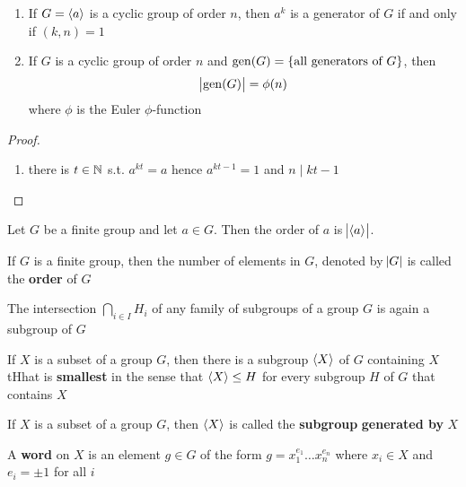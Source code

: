 \documentclass[11pt]{article}
\begin{document}
\begin{theorem}[]
\begin{enumerate}
\item If \(G=\langle a\rangle\) is a cyclic group of order \(n\), then \(a^k\) is a generator
of \(G\) if and only if \((k,n)=1\)
\item If \(G\) is a cyclic group of order \(n\) and \(\operatorname{gen}(G)=\{\text{all generators
      of } G\}\), then
\begin{equation*}
\abs{\operatorname{gen}(G)}=\phi(n)
\end{equation*}
where \(\phi\) is the Euler \(\phi\)-function
\end{enumerate}
\end{theorem}
\begin{proof}
\begin{enumerate}
\item there is \(t\in\mathbb{N}\) s.t. \(a^{kt}=a\) hence \(a^{kt-1}=1\) and \(n\mid kt-1\)
\end{enumerate}
\end{proof}

\begin{proposition}[]
Let \(G\) be a finite group and let \(a\in G\). Then the order of \(a\) is
\(\abs{\langle a\rangle}\).
\end{proposition}

\begin{definition}[]
If \(G\) is a finite group, then the number of elements in \(G\), denoted by
\(\abs{G}\) is called the \textbf{order} of \(G\)
\end{definition}


\begin{proposition}[]
The intersection \(\bigcap_{i\in I}H_i\) of any family of subgroups of a group
\(G\) is again a subgroup of \(G\)
\end{proposition}


\begin{corollary}[]
If \(X\) is a subset of a group \(G\), then there is a subgroup \(\langle X\rangle\) of \(G\)
containing \(X\) tHhat is \textbf{smallest} in the sense that \(\langle X\rangle\le H\) for
every subgroup \(H\) 
of \(G\) that contains \(X\)
\end{corollary}


\begin{definition}[]
If \(X\) is a subset of a group \(G\), then \(\langle X\rangle\) is called the \textbf{subgroup}
\textbf{generated by} \(X\)
\end{definition}

A \textbf{word} on \(X\) is an element \(g\in G\) of the form \(g=x_1^{e_1}\dots
   x_n^{e_n}\) where \(x_i\in X\) and \(e_i=\pm 1\) for all \(i\)
\end{document}
